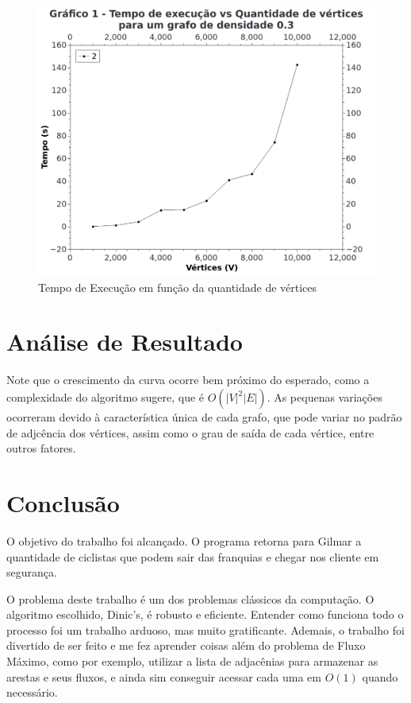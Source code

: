 \documentclass[
	12pt,
	a4paper,
	onepage,
	brazil
]{article}
\theoremstyle{definition}
\begin{document}
	\begin{figure}[H]
		\centering
		\includegraphics[scale=1.2]{graph1.png}
		\caption{Tempo de Execução em função da quantidade de vértices}
	\end{figure}
	
	\section{Análise de Resultado}
	
	Note que o crescimento da curva ocorre bem próximo do esperado, como a complexidade do algoritmo sugere, que é $O(|V|^2|E|)$. As pequenas variações ocorreram devido à característica única de cada grafo, que pode variar no padrão de adjcência dos vértices, assim como o grau de saída de cada vértice, entre outros fatores.
	
	\section{Conclusão}
	
	O objetivo do trabalho foi alcançado. O programa retorna para Gilmar a quantidade de ciclistas que podem sair das franquias e chegar nos cliente em segurança.
	
	O problema deste trabalho é um dos problemas clássicos da computação. O algoritmo escolhido, Dinic's, é robusto e eficiente. Entender como funciona todo o processo foi um trabalho arduoso, mas muito gratificante. Ademais, o trabalho foi divertido de ser feito e me fez aprender coisas além do problema de Fluxo Máximo, como por exemplo, utilizar a lista de adjacênias para armazenar as arestas e seus fluxos, e ainda sim conseguir acessar cada uma em $O(1)$ quando necessário.
	
\end{document}

